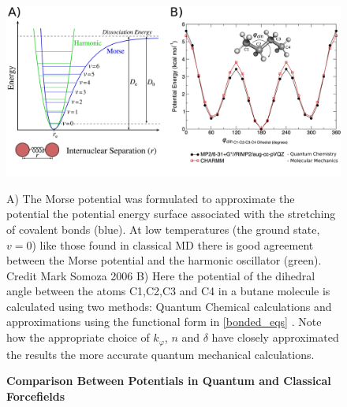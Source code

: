 \begin{figure}
	\begin{center}
	\includegraphics[width=\textwidth]{figures/QM_MM_compared.pdf}
	\end{center}
	\captionsetup{singlelinecheck = false, justification=raggedright}
	\caption[Comparison Between Potentials in Quantum and Classical Forcefields] {\textbf{Comparison Between Potentials in Quantum and Classical Forcefields}}{ A) The Morse potential was formulated to approximate the potential the potential energy surface associated with the stretching of covalent bonds (blue). At low temperatures (the ground state, $v=0$) like those found in classical MD there is good agreement between the Morse potential and the harmonic oscillator (green). Credit Mark Somoza 2006 B) Here the potential of the dihedral angle between the atoms C1,C2,C3 and C4 in a butane molecule is calculated using two methods: Quantum Chemical calculations and approximations using the functional form in \ref{bonded_eqs} \cite{lemkul2020}. Note how the appropriate choice of $k_\varphi$, $n$ and $\delta$ have closely approximated the results the more accurate quantum mechanical calculations.}

	\label{morse_potential}
\end{figure}

